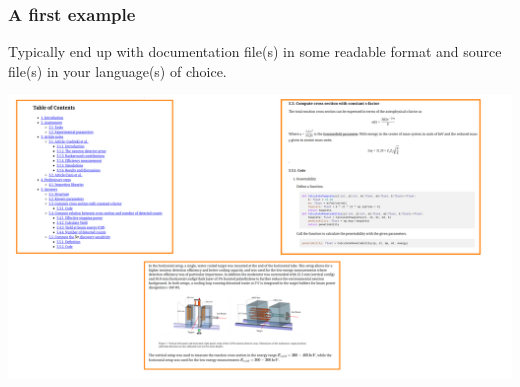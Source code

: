 \documentclass{Gesue_PresentationTemplate}
\begin{document}
\begin{frame}
  \frametitle{A first example}
  \begin{block}{}
    Typically end up with documentation file(s)
    in some \alert{readable format}
    and source file(s)
    in your \alert{language(s) of choice}.
  \end{block}
  \centering
  \includegraphics[width = .75\linewidth]{Images/html_example.pdf}
\end{frame}
\end{document}
